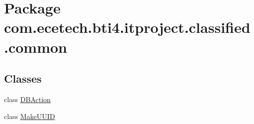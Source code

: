 \hypertarget{namespacecom_1_1ecetech_1_1bti4_1_1itproject_1_1classified_1_1common}{}\section{Package com.\+ecetech.\+bti4.\+itproject.\+classified.\+common}
\label{namespacecom_1_1ecetech_1_1bti4_1_1itproject_1_1classified_1_1common}
\subsection*{Classes}
\begin{DoxyCompactItemize}
\item 
class \hyperlink{classcom_1_1ecetech_1_1bti4_1_1itproject_1_1classified_1_1common_1_1_d_b_action}{D\+B\+Action}
\item 
class \hyperlink{classcom_1_1ecetech_1_1bti4_1_1itproject_1_1classified_1_1common_1_1_make_u_u_i_d}{Make\+U\+U\+ID}
\end{DoxyCompactItemize}

